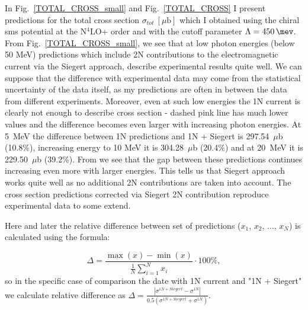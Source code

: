     In Fig.~\ref{TOTAL_CROSS_small} and Fig.~\ref{TOTAL_CROSS} 
    I present predictions for the
    total cross section $\sigma_{tot}~[\mu\text{b}]$ which I obtained
    using the chiral \gls{sms} potential at the N$^4$LO+ order and with 
    the cutoff parameter $\Lambda=\SI{450}{\mev}$.
    From Fig.~\ref{TOTAL_CROSS_small}, we see that at low photon energies
    (below 50 MeV) predictions which include 2N contributions
    to the electromagnetic current
    via the Siegert approach, describe experimental results quite well.
    We can suppose that the difference with experimental data may come from 
    the statistical uncertainty of  the data itself, as my predictions
    are often in between the data from different experiments.
    Moreover, even at such low energies the 1N current is clearly not enough
    to describe cross section - dashed pink line has much lower values and
    the difference becomes even larger with increasing photon energies.
    At 5~MeV the difference between 1N predictions
    and 1N + Siegert is 297.54~$\mu$b (10.8\%), increasing energy to 10 MeV
    it is 304.28~$\mu$b (20.4\%) and at 20~MeV it is 229.50~$\mu$b (39.2\%).
    From  we see that the gap between these predictions
     continues increasing even more with larger energies.
    This tells us that Siegert approach works quite well as no additional 2N contributions are taken into account.
    The cross section predictions corrected via Siegert 2N contribution  reproduce 
    experimental data to some extend.

    Here and later the relative difference between set of predictions ($x_1$, $x_2$, ..., $x_N$) is calculated
    using the formula:

    \begin{equation}
        \Delta = \frac{\max(x) - \min(x)}{\frac{1}{N}\sum_{i=1}^N x_i} \cdot 100\%,
        \label{eq:relative_diff}
    \end{equation}
    so in the specific case of comparison the date with 1N current and "1N + Siegert" we
    calculate relative difference as 
    $\Delta = \frac{|\sigma^{1N+Siegert} - \sigma^{1N}|}{0.5(\sigma^{1N+Siegert} + \sigma^{1N})}$.

